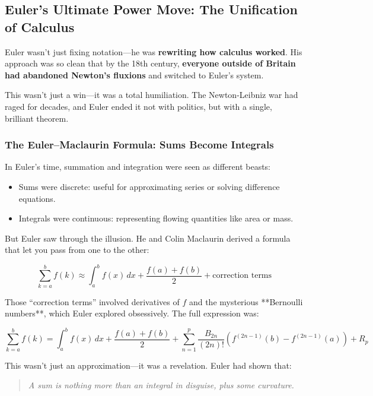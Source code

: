 \subsection{Euler’s Ultimate Power Move: The Unification of Calculus}  

Euler wasn’t just fixing notation—he was \textbf{rewriting how calculus worked}. His approach was so clean that by the 18th century, \textbf{everyone outside of Britain had abandoned Newton’s fluxions} and switched to Euler’s system.  

This wasn’t just a win—it was a total humiliation. The Newton-Leibniz war had raged for decades, and Euler ended it not with politics, but with a single, brilliant theorem.

\vspace{1em}
\subsubsection{The Euler–Maclaurin Formula: Sums Become Integrals}

In Euler’s time, summation and integration were seen as different beasts:

\begin{itemize}
  \item Sums were discrete: useful for approximating series or solving difference equations.
  \item Integrals were continuous: representing flowing quantities like area or mass.
\end{itemize}

But Euler saw through the illusion. He and Colin Maclaurin derived a formula that let you pass from one to the other:

\[
\sum_{k=a}^{b} f(k) \approx \int_a^b f(x) \, dx + \frac{f(a) + f(b)}{2} + \text{correction terms}
\]

Those “correction terms” involved derivatives of \( f \) and the mysterious **Bernoulli numbers**, which Euler explored obsessively. The full expression was:

\[
\sum_{k=a}^{b} f(k) = \int_a^b f(x)\,dx + \frac{f(a) + f(b)}{2} + \sum_{n=1}^{p} \frac{B_{2n}}{(2n)!} \left(f^{(2n-1)}(b) - f^{(2n-1)}(a)\right) + R_p
\]

This wasn’t just an approximation—it was a revelation. Euler had shown that:

\begin{quote}
\textit{A sum is nothing more than an integral in disguise, plus some curvature.}
\end{quote}

